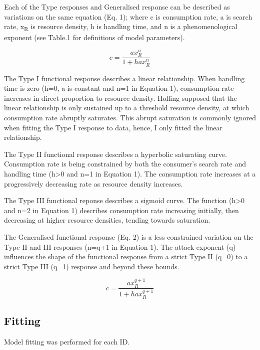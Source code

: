 \documentclass[11pt]{article}
\begin{document}
            Each of the Type responses and Generalised response can be described as variations on the same equation (Eq. 1); where c is consumption rate, a is search rate, x\textsubscript{R} is resource density, h is handling time, and n is a phenomenological exponent (see Table.1 for definitions of model parameters).

            \begin{equation}
                c = \frac{ax_{R}^n}{1 + hax_{R}^n}
            \end{equation}

            The Type I functional response describes a linear relationship. When handling time is zero (h=0, a is constant and n=1 in Equation 1), consumption rate increases in direct proportion to resource density. Holling \citep{holling1959some} supposed that the linear relationship is only sustained up to a threshold resource density, at which consumption rate abruptly saturates. This abrupt saturation is commonly ignored when fitting the Type I response to data, hence, I only fitted the linear relationship.
            
            The Type II functional response \citep{holling1959some} describes a hyperbolic saturating curve. Consumption rate is being constrained by both the consumer's search rate and handling time (h\textgreater0 and n=1 in Equation 1). The consumption rate increases at a progressively decreasing rate as resource density increases.

            The Type III functional reponse \citep{holling1966functional} describes a sigmoid curve. The function \citep{real1977kinetics} (h\textgreater0 and n=2 in Equation 1) describes consumption rate increasing initially, then decreasing at higher resource densities, tending towards saturation.

            The Generalised functional response (Eq. 2) is a less constrained variation on the Type II and III responses (n=q+1 in Equation 1). The attack exponent (q) influences the shape of the functional response from a strict Type II (q=0) to a strict Type III (q=1) response and beyond these bounds.

            \begin{equation}
                c = \frac{ax_{R}^{q+1}}{1 + hax_{R}^{q+1}}
            \end{equation}

        \subsection{Fitting}
            Model fitting was performed for each ID.
            
\end{document}
